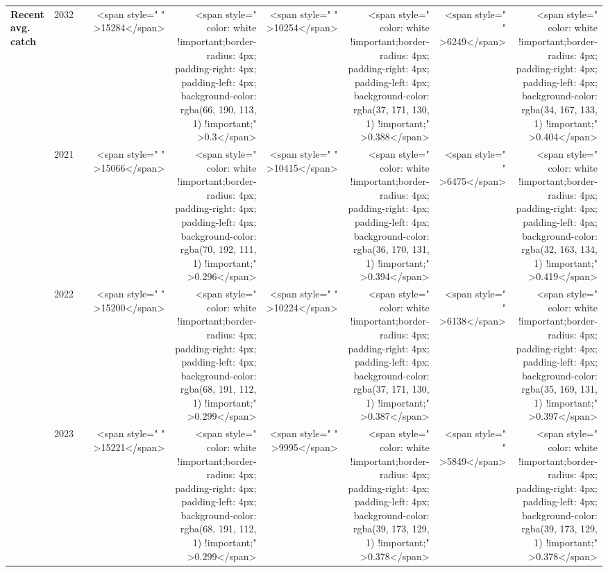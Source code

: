 \begin{table}
\begin{tabular}[t]{>{}l|l>{}rr>{}r|rrrr}
\multirow{-12}{*}{\raggedright\arraybackslash \textbf{Recent avg. catch}} & 2032 & \cellcolor[HTML]{858379}{\textcolor{white}{700}} & <span style="     " >15284</span> & <span style="     color: white !important;border-radius: 4px; padding-right: 4px; padding-left: 4px; background-color: rgba(66, 190, 113, 1) !important;" >0.3</span> & <span style="     " >10254</span> & <span style="     color: white !important;border-radius: 4px; padding-right: 4px; padding-left: 4px; background-color: rgba(37, 171, 130, 1) !important;" >0.388</span> & <span style="     " >6249</span> & <span style="     color: white !important;border-radius: 4px; padding-right: 4px; padding-left: 4px; background-color: rgba(34, 167, 133, 1) !important;" >0.404</span>\\
\cmidrule{1-9}
 & 2021 & \cellcolor[HTML]{858379}{\textcolor{white}{700}} & <span style="     " >15066</span> & <span style="     color: white !important;border-radius: 4px; padding-right: 4px; padding-left: 4px; background-color: rgba(70, 192, 111, 1) !important;" >0.296</span> & <span style="     " >10415</span> & <span style="     color: white !important;border-radius: 4px; padding-right: 4px; padding-left: 4px; background-color: rgba(36, 170, 131, 1) !important;" >0.394</span> & <span style="     " >6475</span> & <span style="     color: white !important;border-radius: 4px; padding-right: 4px; padding-left: 4px; background-color: rgba(32, 163, 134, 1) !important;" >0.419</span>\\

 & 2022 & \cellcolor[HTML]{858379}{\textcolor{white}{700}} & <span style="     " >15200</span> & <span style="     color: white !important;border-radius: 4px; padding-right: 4px; padding-left: 4px; background-color: rgba(68, 191, 112, 1) !important;" >0.299</span> & <span style="     " >10224</span> & <span style="     color: white !important;border-radius: 4px; padding-right: 4px; padding-left: 4px; background-color: rgba(37, 171, 130, 1) !important;" >0.387</span> & <span style="     " >6138</span> & <span style="     color: white !important;border-radius: 4px; padding-right: 4px; padding-left: 4px; background-color: rgba(35, 169, 131, 1) !important;" >0.397</span>\\

 & 2023 & \cellcolor[HTML]{B0A473}{\textcolor{white}{633}} & <span style="     " >15221</span> & <span style="     color: white !important;border-radius: 4px; padding-right: 4px; padding-left: 4px; background-color: rgba(68, 191, 112, 1) !important;" >0.299</span> & <span style="     " >9995</span> & <span style="     color: white !important;border-radius: 4px; padding-right: 4px; padding-left: 4px; background-color: rgba(39, 173, 129, 1) !important;" >0.378</span> & <span style="     " >5849</span> & <span style="     color: white !important;border-radius: 4px; padding-right: 4px; padding-left: 4px; background-color: rgba(39, 173, 129, 1) !important;" >0.378</span>\\


\end{tabular}
\end{table}
